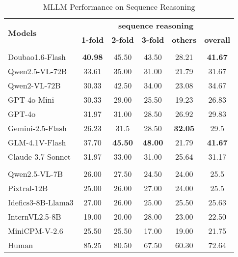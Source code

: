\documentclass{article}
\begin{document}
\begin{table}[t]
\centering
\caption{MLLM Performance on Sequence Reasoning}
\label{tab:sequence_reasoning}
\begin{tabular}{l|ccccc}
\toprule
\multirow{2}{*}{\textbf{Models}} & \multicolumn{5}{c}{\textbf{sequence reasoning}} \\
 & \textbf{1-fold} & \textbf{2-fold} & \textbf{3-fold} & \textbf{others} & \textbf{overall} \\
\midrule
\rowcolor{yellow!20}\multicolumn{6}{l}{\textbf{\textit{Proprietary}}} \\
Doubao1.6-Flash &\cellcolor{gray!30}\textbf{40.98} &45.50 &43.50 &28.21 &\cellcolor{gray!30}\textbf{41.67} \\
Qwen2.5-VL-72B &33.61 &35.00 &31.00 &21.79 & 31.67\\
Qwen2-VL-72B &30.33 &42.50 & 34.00&23.08 &34.67 \\
GPT-4o-Mini &30.33 & 29.00& 25.50&19.23 &26.83 \\
GPT-4o & 31.97&31.00 &28.50 & 26.92&29.83 \\
Gemini-2.5-Flash &26.23 &31.5 & 28.50&\cellcolor{gray!30}\textbf{32.05} &29.5 \\
GLM-4.1V-Flash & 37.70& \cellcolor{gray!30}\textbf{45.50}&\cellcolor{gray!30}\textbf{48.00} & 21.79&\cellcolor{gray!30}\textbf{41.67} \\
Claude-3.7-Sonnet &31.97 &33.00 &31.00 & 25.64& 31.17\\
\midrule
\rowcolor{yellow!20}\multicolumn{6}{l}{\textbf{\textit{Open-source}}} \\
Qwen2.5-VL-7B &26.00 &27.50 & 24.50&24.00 & 25.5\\
Pixtral-12B &25.00 & 26.00& 27.00& 24.00& 25.5\\
Idefics3-8B-Llama3 &27.00 &26.00 &25.00 & 25.50&25.63 \\
InternVL2.5-8B & 19.00& 20.00& 28.00&23.00 & 22.50\\
MiniCPM-V-2.6 & 25.50& 25.50&17.00 & 19.00& 21.75\\
\midrule
Human&85.25&80.50&67.50&60.30&72.64\\
\bottomrule
\end{tabular}
\end{table}
\end{document}
